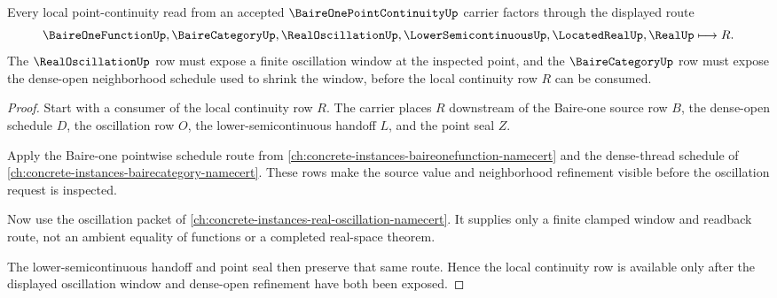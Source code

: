 \begin{theorem}
\label{thm:baire-one-point-continuity-oscillation-window}
Every local point-continuity read from an accepted $\BaireOnePointContinuityUp$ carrier factors through the displayed route
$$
\BaireOneFunctionUp,\BaireCategoryUp,\RealOscillationUp,\LowerSemicontinuousUp,\LocatedRealUp,\RealUp \longmapsto R .
$$
The $\RealOscillationUp$ row must expose a finite oscillation window at the inspected point, and the $\BaireCategoryUp$ row must expose the dense-open neighborhood schedule used to shrink the window, before the local continuity row $R$ can be consumed.
\end{theorem}
\begin{proof}
Start with a consumer of the local continuity row $R$. The carrier places $R$ downstream of the Baire-one source row $B$, the dense-open schedule $D$, the oscillation row $O$, the lower-semicontinuous handoff $L$, and the point seal $Z$.

Apply the Baire-one pointwise schedule route from \autoref{ch:concrete-instances-baireonefunction-namecert} and the dense-thread schedule of \autoref{ch:concrete-instances-bairecategory-namecert}. These rows make the source value and neighborhood refinement visible before the oscillation request is inspected.

Now use the oscillation packet of \autoref{ch:concrete-instances-real-oscillation-namecert}. It supplies only a finite clamped window and readback route, not an ambient equality of functions or a completed real-space theorem.

The lower-semicontinuous handoff and point seal then preserve that same route. Hence the local continuity row is available only after the displayed oscillation window and dense-open refinement have both been exposed.
\end{proof}

